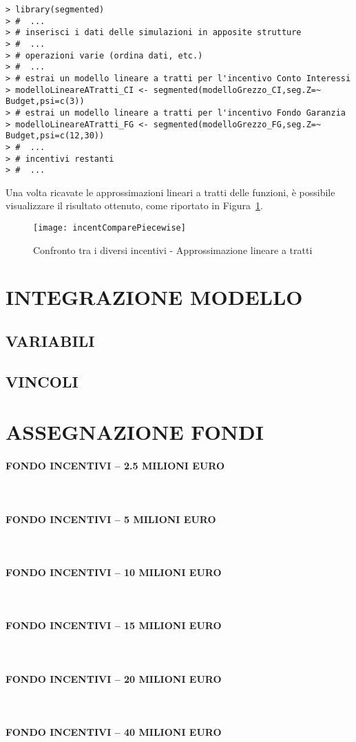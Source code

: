 \documentclass[12pt,a4paper,openright,twoside]{report}
\newcommand{\myparagraph}[1]{\paragraph{#1}\mbox{}\\}
\begin{document}
\lstset{language=R}
\begin{lstlisting}
> library(segmented)
> #  ...
> # inserisci i dati delle simulazioni in apposite strutture 
> #  ...
> # operazioni varie (ordina dati, etc.)
> #  ...
> # estrai un modello lineare a tratti per l'incentivo Conto Interessi
> modelloLineareATratti_CI <- segmented(modelloGrezzo_CI,seg.Z=~ Budget,psi=c(3))
> # estrai un modello lineare a tratti per l'incentivo Fondo Garanzia
> modelloLineareATratti_FG <- segmented(modelloGrezzo_FG,seg.Z=~ Budget,psi=c(12,30))
> #  ...
> # incentivi restanti
> #  ...
\end{lstlisting}

Una volta ricavate le approssimazioni lineari a tratti delle funzioni, è possibile visualizzare il risultato ottenuto, come riportato in Figura~\ref{incentCompare_piecewise}.

\begin{figure}[hbt]
	\centering
	\texttt{[image: incentComparePiecewise]}
	\caption{Confronto tra i diversi incentivi - Approssimazione lineare a tratti}
	\label{incentCompare_piecewise}
\end{figure}

\section{INTEGRAZIONE MODELLO}

\subsection{VARIABILI}

\subsection{VINCOLI}

\section{ASSEGNAZIONE FONDI}

\myparagraph{FONDO INCENTIVI – 2.5 MILIONI EURO}

\myparagraph{FONDO INCENTIVI – 5 MILIONI EURO}

\myparagraph{FONDO INCENTIVI – 10 MILIONI EURO}

\myparagraph{FONDO INCENTIVI – 15 MILIONI EURO}

\myparagraph{FONDO INCENTIVI – 20 MILIONI EURO}

\myparagraph{FONDO INCENTIVI – 40 MILIONI EURO}

\nocite{*}


\end{document}
